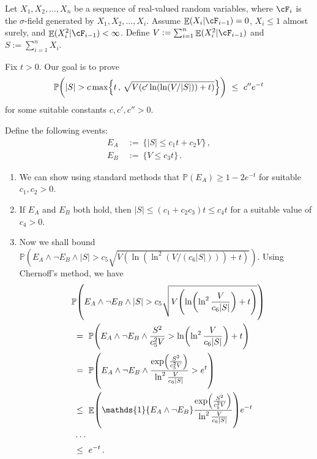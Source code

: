 \documentclass[11pt]{article}
\DeclareMathOperator{\E}{\mathbb{E}}
\renewcommand{\P}{\ensuremath{\mathbb{P}}}
\theoremstyle{remark}
\theoremstyle{definition}
\newcommand\braces[1]{\{#1\}}
\newcommand\ind[1]{\ensuremath{\mathds{1}\{#1\}}}
\newcommand\Parens[1]{\mleft(#1\mright)}
\newcommand\Braces[1]{\mleft\{#1\mright\}}
\begin{document}
Let $X_1, X_2, \dotsc, X_n$ be a sequence of real-valued random
variables, where $\cF_i$ is the $\sigma$-field generated by $X_1, X_2,
\dotsc, X_i$.
Assume $\E(X_i|\cF_{i-1}) = 0$, $X_i \leq 1$ almost surely, and
$\E(X_i^2|\cF_{i-1}) < \infty$.
Define $V := \sum_{i=1}^n \E(X_i^2|\cF_{i-1})$ and $S := \sum_{i=1}^n
X_i$.

Fix $t>0$.
Our goal is to prove
\[
  \P\Parens{
    |S| > c \max\Braces{ t \,,\, \sqrt{V (c' \ln(\ln(V/|S|)) + t)} }
  }
  \ \leq \ c'' e^{-t}
\]
for some suitable constants $c, c', c'' > 0$.

Define the following events:
\begin{align*}
  E_A & \ := \ \braces{ |S| \leq c_1 t + c_2 V }
  \,, \\
  E_B & \ := \ \braces{ V \leq c_3 t }
  \,.
\end{align*}
\begin{enumerate}
  \item
    We can show using standard methods that $\P(E_A) \geq 1-2e^{-t}$
    for suitable $c_1, c_2 > 0$.

  \item
    If $E_A$ and $E_B$ both hold, then $|S| \leq (c_1 + c_2c_3) t \leq
    c_4 t$ for a suitable value of $c_4 > 0$.

  \item
    Now we shall bound $\P(E_A \wedge \neg E_B \wedge |S| > c_5
    \sqrt{V (\ln(\ln^2(V/(c_6|S|))) + t)})$.
    Using Chernoff's method, we have
    \begin{align*}
      \lefteqn{
        \P\Parens{
          E_A \wedge \neg E_B \wedge
          |S| > c_5 \sqrt{
            V \Parens{
              \ln\Parens{
                \ln^2\frac{V}{c_6|S|}
              } + t
            }
          }
        }
      } \\
      & \ = \
      \P\Parens{
        E_A \wedge \neg E_B \wedge
        \frac{S^2}{c_5^2V}
        > \ln\Parens{\ln^2\frac{V}{c_6|S|}} + t
      }
      \\
      & \ = \
      \P\Parens{
        E_A \wedge \neg E_B \wedge
        \frac{
          \exp\Parens{\frac{S^2}{c_5^2V}}
        }{
          \ln^2\frac{V}{c_6|S|}
        }
        > e^t
      }
      \\
      & \ \leq \
      \E\Parens{
        \ind{E_A \wedge \neg E_B}
        \frac{
          \exp\Parens{\frac{S^2}{c_5^2V}}
        }{
          \ln^2\frac{V}{c_6|S|}
        }
      }
      e^{-t}
      \\
      & \ \dotsb \
      \\
      & \ \leq \
      e^{-t}
      \,.
    \end{align*}

\end{enumerate}
\end{document}
